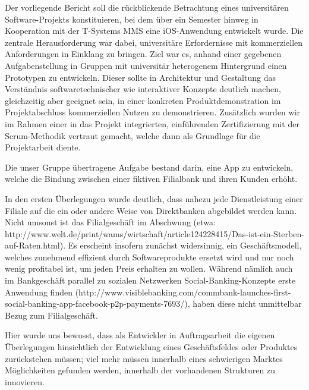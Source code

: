 
Der vorliegende Bericht soll die rückblickende Betrachtung eines universitären Software-Projekts konstituieren, bei dem über ein Semester hinweg in Kooperation mit der T-Systems MMS eine iOS-Anwendung entwickelt wurde. Die zentrale Herausforderung war dabei, universitäre Erfordernisse mit kommerziellen Anforderungen in Einklang zu bringen. Ziel war es, anhand einer gegebenen Aufgabenstellung in Gruppen mit universitär heterogenem Hintergrund einen Prototypen zu entwickeln.
Dieser sollte in Architektur und Gestaltung das Verständnis softwaretechnischer wie interaktiver Konzepte deutlich machen, gleichzeitig aber geeignet sein, in einer konkreten Produktdemonstration im Projektabschluss kommerziellen Nutzen zu demonstrieren.
Zusätzlich wurden wir im Rahmen einer in das Projekt integrierten, einführenden Zertifizierung mit der Scrum-Methodik vertraut gemacht, welche dann als Grundlage für die Projektarbeit diente. 

	Die unser Gruppe übertragene Aufgabe bestand darin, eine App zu entwickeln, welche die Bindung zwischen einer fiktiven Filialbank und ihren Kunden erhöht.
	
	 In den ersten Überlegungen wurde deutlich, dass nahezu jede Dienstleistung einer Filiale auf die ein oder andere Weise von Direktbanken abgebildet werden kann. Nicht umsonst ist das Filialgeschäft im Abschwung (etwa: http://www.welt.de/print/wams/wirtschaft/article124228415/Das-ist-ein-Sterben-auf-Raten.html). Es erscheint insofern zunächst widersinnig, ein Geschäftsmodell, welches zunehmend effizient durch Softwareprodukte ersetzt wird und nur noch wenig profitabel ist, um jeden Preis erhalten zu wollen. Während nämlich auch im Bankgeschäft parallel zu sozialen Netzwerken Social-Banking-Konzepte erste Anwendung finden (http://www.visiblebanking.com/commbank-launches-first-social-banking-app-facebook-p2p-payments-7693/), haben diese nicht unmittelbar Bezug zum Filialgeschäft.
	 
	 Hier wurde uns bewusst, dass als Entwickler in Auftragsarbeit die eigenen Überlegungen hinsichtlich der Entwicklung eines Geschäftsfeldes oder Produktes zurückstehen müssen; viel mehr müssen innerhalb eines schwierigen Marktes Möglichkeiten gefunden werden, innerhalb der vorhandenen Strukturen zu innovieren.
	 